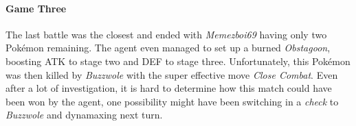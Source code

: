 \paragraph{Game Three}
The last battle was the closest and ended with \textit{Memezboi69} having only two Pokémon remaining. The agent
even managed to set up a burned \textit{Obstagoon}, boosting \ac{ATK} to stage two and \ac{DEF} to stage three.
Unfortunately, this Pokémon was then killed by \textit{Buzzwole} with the super effective move \textit{Close Combat}.
Even after a lot of investigation, it is hard to determine how this match could have been won by the agent, one 
possibility might have been switching in a \textit{check} to \textit{Buzzwole} and dynamaxing next turn.
